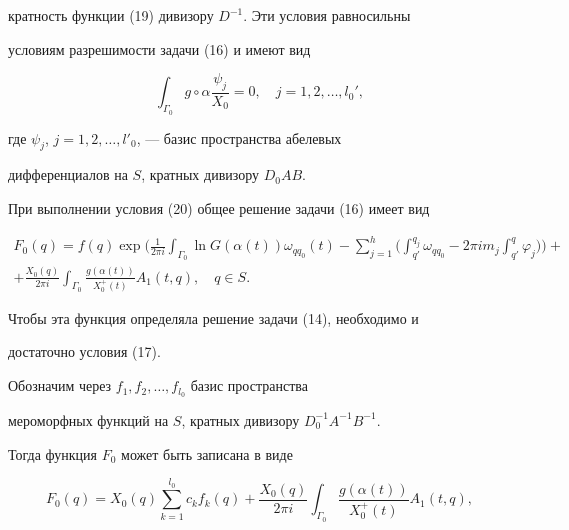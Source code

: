 кратность функции (19) дивизору $D^{-1}$. Эти условия равносильны


условиям разрешимости задачи (16) и имеют вид


\begin{equation}


\int_{\Gamma_0}g\circ\alpha\frac{\psi_j}{X_0}=0,\quad


j=1,2,\dotsc,l_0',


\end{equation}


где $\psi_j$, $j=1, 2,\dotsc,l'_0$, --- базис пространства абелевых


дифференциалов на $S$, кратных дивизору $D_0AB$.





При выполнении условия (20) общее решение задачи (16) имеет вид


\begin{multline}


F_0(q)=


f(q)\exp\bigg(\frac1{2\pi i}\int_{\Gamma_0}\ln G(\alpha


(t))\omega_{qq_0}(t)-\sum_{j=1}^h\Big(\int_{q'}^{q_j}\omega_{qq_0}


-2\pi im_j\int_{q'}^{q}\varphi_j\Big)\bigg)+ \\


%


+\frac{X_0(q)}{2\pi i}


\int_{\Gamma_0}\frac{g(\alpha(t))}{X_0^+(t)}A_1(t, q),\quad q\in S.


\end{multline}


Чтобы эта функция определяла решение задачи (14), необходимо и


достаточно условия (17).





Обозначим через $f_1,f_2,\dotsc,f_{l_0}$ базис пространства


мероморфных функций на $S$, кратных дивизору $D_0^{-1}A^{-1}B^{-1}$.


Тогда функция $F_0$ может быть записана в виде


\begin{equation}


F_0(q)=X_0(q)\sum_{k=1}^{l_0}c_kf_k(q)+


\frac{X_0(q)}{2\pi i}


\int_{\Gamma_0}\frac{g(\alpha(t))}{X_0^+(t)}A_1(t, q),


\end{equation}


